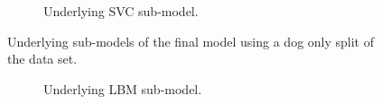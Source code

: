 \begin{figure}[ht]
\begin{subfigure}{.45\textwidth}
        \captionsetup{width=0.8\linewidth}
        \captionsetup{justification=centering}
        \caption{Underlying SVC sub-model.}
    \end{subfigure}
    \captionsetup{width=0.9\linewidth}
    \captionsetup{justification=centering}
    \caption{Underlying sub-models of the final model using a dog only split of the data set.}
\end{figure}

\begin{figure}[ht]
    \centering
    \begin{subfigure}{.45\textwidth}
        \centering
        \captionsetup{width=0.8\linewidth}
        \captionsetup{justification=centering}
        \caption{Underlying LBM sub-model.}
    \end{subfigure}
    \hspace{1cm}
    \begin{subfigure}{.45\textwidth}
        \centering

\end{subfigure}
\end{figure}
